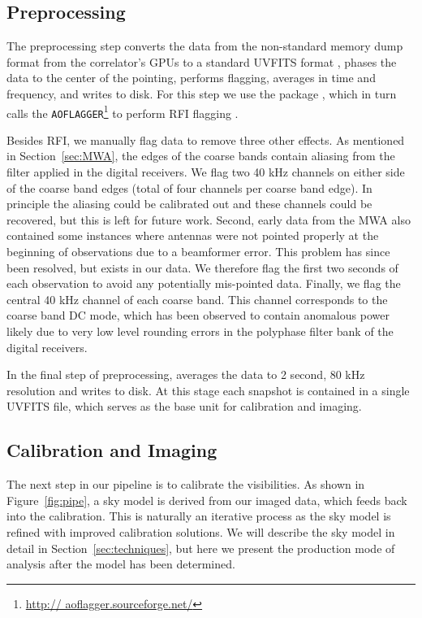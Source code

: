 \documentclass[iop]{emulateapj}
\begin{document}
\subsection{Preprocessing}\label{subsec:preprocessing}
The preprocessing step converts the data from the non-standard memory dump format 
from the correlator's GPUs to a standard UVFITS format \citep{Greisen:2012}, 
phases the data to the center of the pointing,
performs 
flagging, averages in time and frequency, and writes to disk. For this step we use the 
\cotter package \citep{Offringa:2015}, which in turn calls the \texttt{AOFLAGGER}\footnote{\url{http://
aoflagger.sourceforge.net/}} to perform RFI flagging \citep{Offringa:2010}. 

Besides RFI, we manually flag data to remove three other effects. As mentioned in 
Section~\ref{sec:MWA}, the edges of the coarse bands contain aliasing from 
the filter applied in the digital receivers. We flag two 40 kHz channels on either side of the 
coarse band edges (total of four channels per coarse band edge). In principle the aliasing 
could be calibrated out and these channels could be recovered, but this is left for future 
work. Second, early data from the MWA also contained some instances where antennas 
were not pointed properly at the beginning of observations due to a beamformer error. This 
problem has since been resolved, but exists in our data. We therefore flag the first two 
seconds of each observation to avoid any potentially mis-pointed data. 
Finally, we flag the central 40 kHz channel of each coarse band. This channel corresponds
to the coarse band DC mode, which has been observed to contain anomalous power likely
due to very low level rounding errors in the polyphase filter bank of the digital receivers.

In the final step of preprocessing, \cotter averages the data to 2 second, 80 kHz resolution 
and writes to disk. At this stage each snapshot is contained in a single UVFITS file, which 
serves as the base unit for calibration and imaging.


\subsection{Calibration and Imaging}\label{subsec:cal_imaging}
The next step in our pipeline is to calibrate the visibilities. As shown in Figure~\ref{fig:pipe}, 
a sky model is derived from our imaged data, which feeds back into the calibration. This is 
naturally an iterative process as the sky model is refined with improved calibration 
solutions. We will describe the sky model in detail in Section~\ref{sec:techniques}, but here 
we present the production mode of analysis after the model has been determined.
\end{document}
